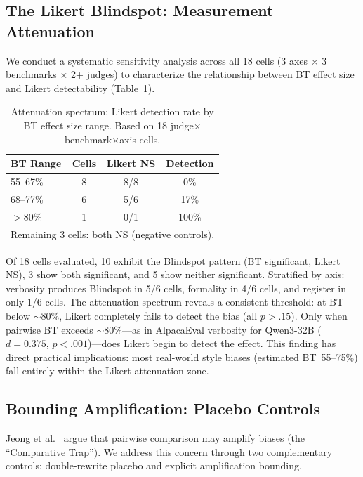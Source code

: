 \documentclass[11pt]{article}
\begin{document}
\subsection{The Likert Blindspot: Measurement Attenuation}

We conduct a systematic sensitivity analysis across all 18 cells (3 axes $\times$ 3 benchmarks $\times$ 2+ judges) to characterize the relationship between BT effect size and Likert detectability (Table~\ref{tab:attenuation}).

\begin{table}[t]
\centering
\small
\caption{Attenuation spectrum: Likert detection rate by BT effect size range. Based on 18 judge$\times$benchmark$\times$axis cells.}
\label{tab:attenuation}
\begin{tabular}{l c c c}
\toprule
\textbf{BT Range} & \textbf{Cells} & \textbf{Likert NS} & \textbf{Detection} \\
\midrule
55--67\% & 8 & 8/8 & 0\% \\
68--77\% & 6 & 5/6 & 17\% \\
${>}$80\% & 1 & 0/1 & 100\% \\
\midrule
\multicolumn{4}{l}{\footnotesize Remaining 3 cells: both NS (negative controls).} \\
\bottomrule
\end{tabular}
\end{table}

Of 18 cells evaluated, 10 exhibit the Blindspot pattern (BT significant, Likert NS), 3 show both significant, and 5 show neither significant.
Stratified by axis: verbosity produces Blindspot in 5/6 cells, formality in 4/6 cells, and register in only 1/6 cells.
The attenuation spectrum reveals a consistent threshold: at BT below ${\sim}$80\%, Likert completely fails to detect the bias (all $p > .15$).
Only when pairwise BT exceeds ${\sim}$80\%---as in AlpacaEval verbosity for Qwen3-32B ($d = 0.375$, $p < .001$)---does Likert begin to detect the effect.
This finding has direct practical implications: most real-world style biases (estimated BT~55--75\%) fall entirely within the Likert attenuation zone.

\subsection{Bounding Amplification: Placebo Controls}

Jeong et al.\ \cite{jeong2025comparative} argue that pairwise comparison may amplify biases (the ``Comparative Trap'').
We address this concern through two complementary controls: double-rewrite placebo and explicit amplification bounding.
\end{document}
